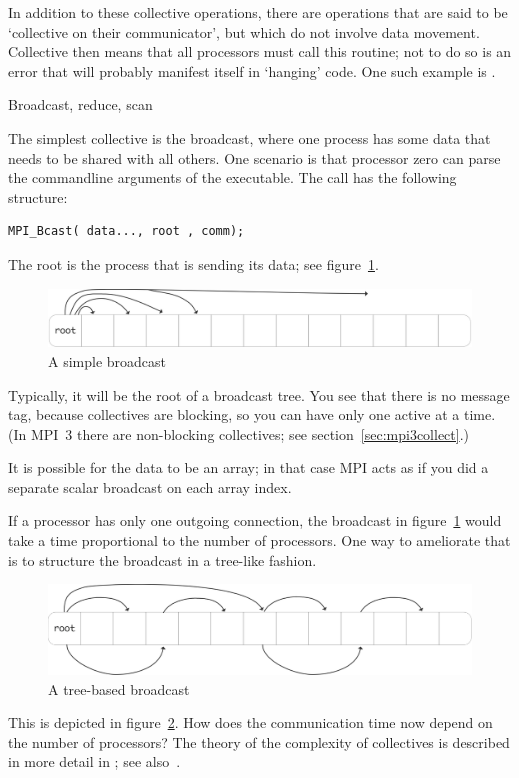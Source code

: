 In addition to these collective operations, there are operations that
are said to be `collective on their communicator', but which do not
involve data movement. Collective then means that all processors must
call this routine; not to do so is an error that will probably
manifest itself in `hanging' code. One such example is
.

 {Broadcast, reduce, scan}
\label{sec:bcast}

The simplest collective is the broadcast, where one process has some
data that needs to be shared with all others. One scenario is that
processor zero can parse the commandline arguments of the executable.
The call has the following structure:
\begin{verbatim}
MPI_Bcast( data..., root , comm);
\end{verbatim}
The root is the process that is sending its data; see figure~\ref{fig:bcast-simple}.
\begin{figure}[ht]
  \includegraphics[scale=.08]{graphics/bcast-simple}
  \caption{A simple broadcast}
  \label{fig:bcast-simple}
\end{figure}
Typically, it will
be the root of a broadcast tree. You see that there is no message tag,
because collectives are blocking, so you can have only one active at a
time. (In MPI~3 there are non-blocking collectives; see
section~\ref{sec:mpi3collect}.)

It is possible for the data to be an array; in that case MPI acts as if you did a 
separate scalar broadcast on each array index.

If a processor has only one outgoing connection, the broadcast in
figure~\ref{fig:bcast-simple} would take a time proportional to the
number of processors. One way to ameliorate that is to structure the
broadcast in a tree-like fashion.
\begin{figure}[ht]
  \includegraphics[scale=.1]{graphics/bcast-tree}
  \caption{A tree-based broadcast}
  \label{fig:bcast-tree}
\end{figure}
This is depicted in figure~\ref{fig:bcast-tree}. How does the
communication time now depend on the number of processors? The theory
of the complexity of collectives is described in more detail in
; see also~\cite{Chan2007Collective}.

